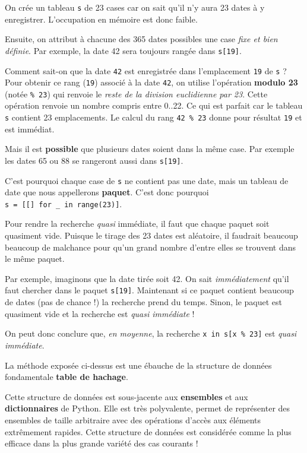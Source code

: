 \documentclass[a4paper,17pt]{extarticle}
\begin{document}
\begin{retenir}
        \end{retenir}\begin{remarque}
    On crée un tableau \texttt{s} de 23 cases car on sait qu'il n'y aura 23
dates à y enregistrer. L'occupation en mémoire est donc faible.

Ensuite, on attribut à chacune des 365 dates possibles une case
\emph{fixe et bien définie}. Par exemple, la date 42 sera toujours
rangée dans \texttt{s{[}19{]}}.

Comment sait-on que la date \texttt{42} est enregistrée dans
l'emplacement \texttt{19} de \texttt{s} ? Pour obtenir ce rang
(\texttt{19}) associé à la date \texttt{42}, on utilise l'opération
\textbf{modulo 23} (notée \texttt{\%\ 23}) qui renvoie le \emph{reste de
la division euclidienne par 23}. Cette opération renvoie un nombre
compris entre 0..22. Ce qui est parfait car le tableau \texttt{s}
contient 23 emplacements. Le calcul du rang \texttt{42\ \%\ 23} donne
pour résultat \texttt{19} et est immédiat.

        \end{remarque}\begin{remarque}
    Mais il est \textbf{possible} que plusieurs dates soient dans la même
case. Par exemple les dates 65 ou 88 se rangeront aussi dans
\texttt{s{[}19{]}}.

C'est pourquoi chaque case de \texttt{s} ne contient pas une date, mais
un tableau de date que nous appellerons \textbf{paquet}. C'est donc
pourquoi \texttt{s\ =\ {[}{[}{]}\ for\ \_\ in\ range(23){]}}.

Pour rendre la recherche \emph{quasi} immédiate, il faut que chaque
paquet soit quasiment vide. Puisque le tirage des 23 dates est
aléatoire, il faudrait beaucoup beaucoup de malchance pour qu'un grand
nombre d'entre elles se trouvent dans le même paquet.

Par exemple, imaginons que la date tirée soit 42. On sait
\emph{immédiatement} qu'il faut chercher dans le paquet
\texttt{s{[}19{]}}. Maintenant si ce paquet contient beaucoup de dates
(pas de chance !) la recherche prend du temps. Sinon, le paquet est
quasiment vide et la recherche est \emph{quasi immédiate} !

On peut donc conclure que, \emph{en moyenne}, la recherche
\texttt{x\ in\ s{[}x\ \%\ 23{]}} est \emph{quasi immédiate}.

        \end{remarque}\begin{retenir}
    La méthode exposée ci-dessus est une ébauche de la structure de données
fondamentale \textbf{table de hachage}.

Cette structure de données est sous-jacente aux \textbf{ensembles} et
aux \textbf{dictionnaires} de Python. Elle est très polyvalente, permet
de représenter des ensembles de taille arbitraire avec des opérations
d'accès aux éléments extrêmement rapides. Cette structure de données est
considérée comme la plus efficace dans la plus grande variété des cas
courants !

        \end{retenir}
\end{document}
